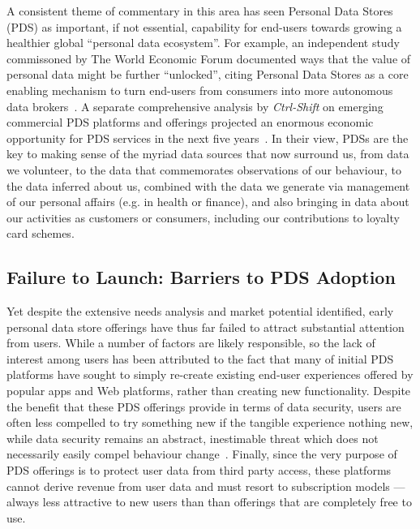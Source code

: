 \documentclass[graybox]{svmult}
\begin{document}

A consistent theme of commentary in this area has seen Personal Data Stores (PDS) as important, if not essential, capability for end-users towards growing a healthier global ``personal data ecosystem''.  For example, an independent study commissoned by The World Economic Forum documented ways that the value of personal data might be further ``unlocked'', citing Personal Data Stores as a core enabling mechanism to turn end-users from consumers into more autonomous data brokers~\cite{WEF-report}.  A separate comprehensive analysis by \emph{Ctrl-Shift} on emerging commercial PDS platforms and offerings projected an enormous economic opportunity for PDS services in the next five years~\cite{ctrlshift}. In their view, PDSs are the key to making sense of the myriad data sources that now surround us, from data we volunteer, to the data that commemorates observations of our behaviour, to the data inferred about us, combined with the data we generate via management of our personal affairs (e.g. in health or finance), and also bringing in data about our activities as customers or consumers, including our contributions to loyalty card schemes.

\subsection{Failure to Launch: Barriers to PDS Adoption}

Yet despite the extensive needs analysis and market potential identified, early personal data store offerings have thus far failed to attract substantial attention from users.  While a number of factors are likely responsible, so the lack of interest among users has been attributed to the fact that many of initial PDS platforms have sought to simply re-create existing end-user experiences offered by popular apps and Web platforms, rather than creating new functionality.  Despite the benefit that these PDS offerings provide in terms of data security, users are often less compelled to try something new if the tangible experience nothing new, while data security remains an abstract, inestimable threat which does not necessarily easily compel behaviour change~\cite{bandura1977self}.  Finally, since the very purpose of PDS offerings is to protect user data from third party access, these platforms cannot derive revenue from user data and must resort to subscription models --- always less attractive to new users than than offerings that are completely free to use. 
\end{document}
